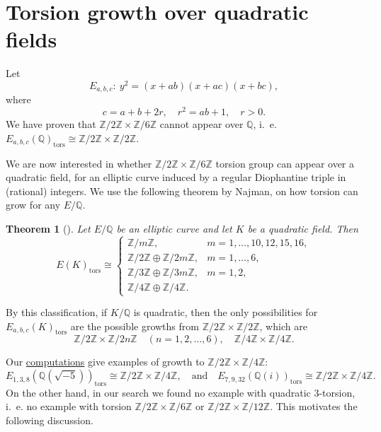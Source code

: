 \documentclass{article}
\theoremstyle{plain}
\newtheorem{theorem}{Theorem}
\newcommand{\Z}{\mathbb{Z}}
\newcommand{\Q}{\mathbb{Q}}
\newcommand{\twotimessix}{\Z/2\Z \times \Z/6\Z}
\newcommand{\tors}{\mathrm{tors}}
\begin{document}
\section{Torsion growth over quadratic fields}\label{sec:quadratic-growth}

Let
\[
E_{a,b,c}:\ y^2=(x+ab)(x+ac)(x+bc),
\]
where
\[
c=a+b+2r,\quad r^2=ab+1,\quad r>0.
\]
We have proven that $\Z/2\Z \times \Z/6\Z $ cannot appear over $\Q$, i.~e.
\(
E_{a,b,c}(\Q)_{\tors}\cong \Z/2\Z\times \Z/2\Z.
\)

We are now interested in whether $\twotimessix$ torsion group can appear over a quadratic field, for an elliptic curve induced by a regular Diophantine triple in (rational) integers. We use the following theorem by Najman, on how torsion can grow for any $E/\Q$.

\begin{theorem}[{}]\label{thm:PhiQ2}
Let \(E/\mathbb{Q}\) be an elliptic curve and let \(K\) be a quadratic field.
Then
\[
E(K)_{\tors}\cong
\begin{cases}
\mathbb{Z}/m\mathbb{Z}, & m=1,\dots,10,12,15,16,\\
\mathbb{Z}/2\mathbb{Z}\oplus \mathbb{Z}/2m\mathbb{Z}, & m=1,\dots,6,\\
\mathbb{Z}/3\mathbb{Z}\oplus \mathbb{Z}/3m\mathbb{Z}, & m=1,2,\\
\mathbb{Z}/4\mathbb{Z}\oplus \mathbb{Z}/4\mathbb{Z}. &
\end{cases}
\]
\end{theorem}

\noindent By this classification, if \(K/\Q\) is quadratic, then the only possibilities for
\(E_{a,b,c}(K)_{\tors}\) are the possible growths from \(\Z/2\Z\times \Z/2\Z\), which are
\[
\mathbb{Z}/2\mathbb{Z} \times \mathbb{Z}/2n\mathbb{Z}
\quad (n=1,2,\dots,6),
\quad
\mathbb{Z}/4\mathbb{Z} \times \mathbb{Z}/4\mathbb{Z}.
\]

Our \href{https://github.com/NikolaAdzaga/TorsionRegularTriples/blob/main/over_quadratic_fields.m}{computations} give examples of growth to
\(\Z/2\Z\times \Z/4\Z\):
\[
E_{1,3,8}\left(\Q(\sqrt{-5})\right)_{\tors}
 \cong \Z/2\Z\times \Z/4\Z,
\quad \text{and} \quad 
E_{7,9,32}\left(\Q(i)\right)_{\tors}
 \cong \Z/2\Z\times \Z/4\Z.
\]
On the other hand, in our search we found no example with quadratic
\(3\)-torsion, i.~e. no example with torsion
\(\Z/2\Z\times \Z/6\Z\) or \(\Z/2\Z\times \Z/12\Z\).
This motivates the following discussion.

\medskip
\end{document}
